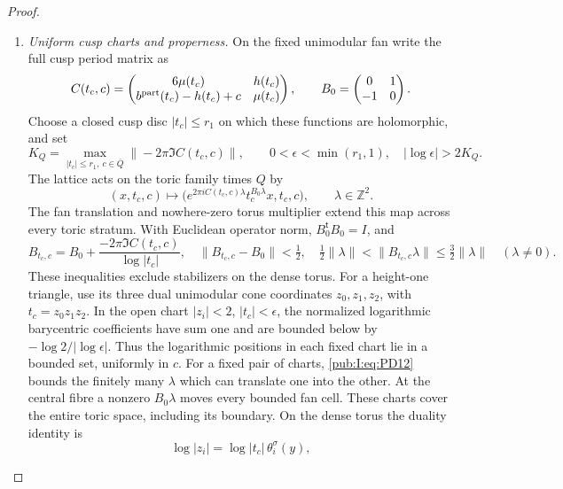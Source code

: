 \begin{proof}
\begin{enumerate}[label=\arabic*.,leftmargin=*]
\item \emph{Uniform cusp charts and properness.}
On the fixed unimodular fan write the full cusp period matrix as
\begin{equation}
 C(t_c,c)=\begin{pmatrix}6\mu(t_c)&h(t_c)\\
 b^{\rm part}(t_c)-h(t_c)+c&\mu(t_c)\end{pmatrix},
 \qquad B_0=\begin{pmatrix}0&1\\-1&0\end{pmatrix}.
\label{pub:I:eq:PD9}
\end{equation}
Choose a closed cusp disc $|t_c|\le r_1$ on which these functions
are holomorphic, and set
\begin{equation}
 K_Q=\max_{|t_c|\le r_1,\ c\in\overline Q}
               \|-2\pi\Im C(t_c,c)\|,
 \qquad 0<\epsilon<\min(r_1,1),\quad
               |\log\epsilon|>2K_Q.
\label{pub:I:eq:PD10}
\end{equation}
The lattice acts on the toric family times $Q$ by
\begin{equation}
 (x,t_c,c)\longmapsto
 \bigl(e^{2\pi iC(t_c,c)\lambda}t_c^{B_0\lambda}x,t_c,c\bigr),
 \qquad\lambda\in\mathbb Z^2.
\label{pub:I:eq:PD11}
\end{equation}
The fan translation and nowhere-zero torus multiplier extend this
map across every toric stratum. With Euclidean operator norm,
$B_0^{\mathsf t}B_0=I$, and
\begin{equation}
 B_{t_c,c}=B_0+\frac{-2\pi\Im C(t_c,c)}{\log|t_c|},
 \quad \|B_{t_c,c}-B_0\|<\tfrac12,
 \quad \tfrac12\|\lambda\|<\|B_{t_c,c}\lambda\|
                    \le\tfrac32\|\lambda\|\quad(\lambda\ne0).
\label{pub:I:eq:PD12}
\end{equation}
These inequalities exclude stabilizers on the dense torus.
For a height-one triangle, use its three dual unimodular cone
coordinates $z_0,z_1,z_2$, with $t_c=z_0z_1z_2$.
In the open chart $|z_i|<2$, $|t_c|<\epsilon$, the normalized
logarithmic barycentric coefficients have sum one and are bounded
below by $-\log2/|\log\epsilon|$. Thus the logarithmic positions
in each fixed chart lie in a bounded set, uniformly in $c$.
For a fixed pair of charts, \eqref{pub:I:eq:PD12} bounds the finitely many
$\lambda$ which can translate one into the other. At the central
fibre a nonzero $B_0\lambda$ moves every bounded fan cell.
These charts cover the entire toric space, including its boundary.
On the dense torus the duality identity is
\[
 \log|z_i|=\log|t_c|\,\theta_i^\sigma(y),
\]
\end{enumerate}
\end{proof}
